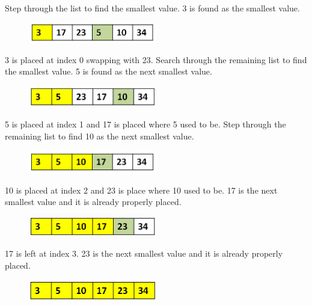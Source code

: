 Step through the list to find the smallest value.  3 is found as the smallest value.

\begin{figure}[H]
\centering
\includegraphics[width=0.5\textwidth]{pictures/selection2.png}
\label{fig:selection2}
\end{figure}

3 is placed at index 0 swapping with 23.  Search through the remaining list to find the smallest value.  5 is found as the next smallest value.

\begin{figure}[H]
\centering
\includegraphics[width=0.5\textwidth]{pictures/selection3.png}
\label{fig:selection3}
\end{figure}

5 is placed at index 1 and 17 is placed where 5 used to be.   Step through the remaining list to find 10 as the next smallest value.

\begin{figure}[H]
\centering
\includegraphics[width=0.5\textwidth]{pictures/selection4.png}
\label{fig:selection4}
\end{figure}

10 is placed at index 2 and 23 is place where 10 used to be. 17 is the next smallest value and it is already properly placed.

\begin{figure}[H]
\centering
\includegraphics[width=0.5\textwidth]{pictures/selection5.png}
\label{fig:selection5}
\end{figure}

17 is left at index 3. 23 is the next smallest value and it is already properly placed.

\begin{figure}[H]
\centering
\includegraphics[width=0.5\textwidth]{pictures/selection6.png}
\label{fig:selection6}
\end{figure}

